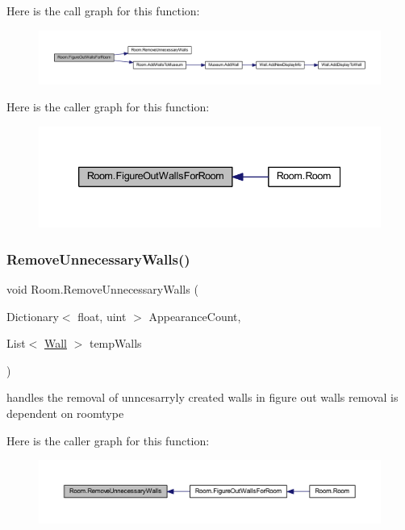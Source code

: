 Here is the call graph for this function\+:\nopagebreak
\begin{figure}[H]
\begin{center}
\leavevmode
\includegraphics[width=350pt]{class_room_aade4dd11dfe01508688d382a49d7c606_cgraph}
\end{center}
\end{figure}
Here is the caller graph for this function\+:\nopagebreak
\begin{figure}[H]
\begin{center}
\leavevmode
\includegraphics[width=339pt]{class_room_aade4dd11dfe01508688d382a49d7c606_icgraph}
\end{center}
\end{figure}
\mbox{\label{class_room_ae3ade89041403549ba23b6d373e62391}} 
\subsubsection{\texorpdfstring{Remove\+Unnecessary\+Walls()}{RemoveUnnecessaryWalls()}}
{\footnotesize\ttfamily void Room.\+Remove\+Unnecessary\+Walls (\begin{DoxyParamCaption}\item[{Dictionary$<$ float, uint $>$}]{Appearance\+Count,  }\item[{List$<$ \mbox{\hyperlink{class_wall}{Wall}} $>$}]{temp\+Walls }\end{DoxyParamCaption})\hspace{0.3cm}{\ttfamily [private]}}



handles the removal of unncesarryly created walls in figure out walls removal is dependent on roomtype 

Here is the caller graph for this function\+:\nopagebreak
\begin{figure}[H]
\begin{center}
\leavevmode
\includegraphics[width=350pt]{class_room_ae3ade89041403549ba23b6d373e62391_icgraph}
\end{center}
\end{figure}


